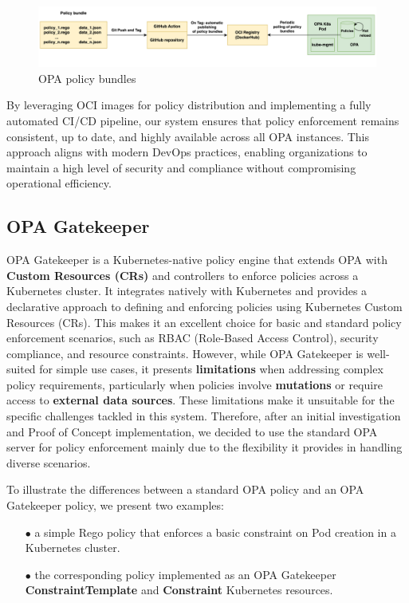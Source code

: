 \begin{figure}[H]
\centering
\includegraphics[width=1\linewidth]{images/opa_bundles.png}
\caption{OPA policy bundles}
\label{fig:opa_bundles}
\end{figure}

By leveraging OCI images for policy distribution and implementing a fully automated CI/CD pipeline, our system ensures that policy enforcement remains consistent, up to date, and highly available across all OPA instances. This approach aligns with modern DevOps practices, enabling organizations to maintain a high level of security and compliance without compromising operational efficiency.

\newpage

\subsection{OPA Gatekeeper}

OPA Gatekeeper is a Kubernetes-native policy engine that extends OPA with \textbf{Custom Resources (CRs)} and controllers to enforce policies across a Kubernetes cluster. It integrates natively with Kubernetes and provides a declarative approach to defining and enforcing policies using Kubernetes Custom Resources (CRs). This makes it an excellent choice for basic and standard policy enforcement scenarios, such as RBAC (Role-Based Access Control), security compliance, and resource constraints.
However, while OPA Gatekeeper is well-suited for simple use cases, it presents \textbf{limitations} when addressing complex policy requirements, particularly when policies involve \textbf{mutations} or require access to \textbf{external data sources}. These limitations make it unsuitable for the specific challenges tackled in this system. Therefore, after an initial investigation and Proof of Concept implementation, we decided to use the standard OPA server for policy enforcement mainly due to the flexibility it provides in handling diverse scenarios.

To illustrate the differences between a standard OPA policy and an OPA Gatekeeper policy, we present two examples:  
\begin{itemize}[itemsep=0.2pt, topsep=1pt]
  \item[$\bullet$] a simple Rego policy that enforces a basic constraint on Pod creation in a Kubernetes cluster.
  \item[$\bullet$] the corresponding policy implemented as an OPA Gatekeeper \textbf{ConstraintTemplate} and \textbf{Constraint} Kubernetes resources.
\end{itemize}

